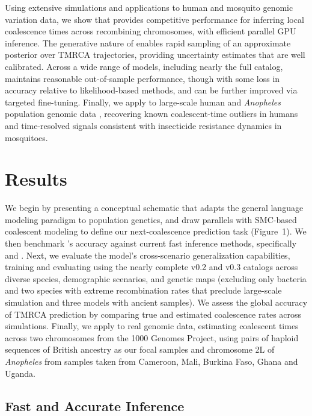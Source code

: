 \documentclass[9pt,twocolumn,twoside]{pnas-new}
\begin{document}
Using extensive simulations and applications to human and mosquito genomic variation data,
we show that \cxtkit provides competitive performance for
inferring local coalescence times across recombining chromosomes,
with efficient parallel GPU inference.
The generative nature of \cxtkit enables rapid sampling of an approximate posterior over TMRCA trajectories,
providing uncertainty estimates that are well calibrated.
Across a wide range of models, including nearly the full \stdpopsim catalog,
\cxtkit maintains reasonable out-of-sample performance, though with some loss in accuracy relative to likelihood-based methods, and can be further improved via targeted fine-tuning.
Finally, we apply \cxtkit to large-scale human and \textit{Anopheles} population genomic data
\cite{10002010map, auton20151000, anopheles2017genetic, clarkson2020genome},
recovering known coalescent-time outliers in humans and time-resolved signals consistent with insecticide resistance dynamics in mosquitoes.

\section*{Results}

We begin by presenting a conceptual schematic that adapts the general language modeling paradigm to population genetics, and draw parallels with SMC-based coalescent modeling to define our next-coalescence prediction task (Figure~1). We then benchmark \cxtkit's accuracy against current fast inference 
methods, specifically \singer and \smcpp \cite{deng_robust_2024, terhorst_robust_2017}. 
Next, we evaluate the model's cross-scenario generalization capabilities, 
training and evaluating using the nearly complete \stdpopsim v0.2 and v0.3 catalogs across diverse species, demographic scenarios, and genetic maps (excluding only bacteria and two species with extreme recombination rates that preclude large-scale simulation and three models with ancient samples). 
We assess the global accuracy of TMRCA prediction by comparing true and estimated coalescence rates across simulations. 
Finally, we apply \cxtkit to real genomic data, estimating coalescent times across two
chromosomes from the 1000 Genomes Project, using pairs of haploid sequences of British ancestry as our focal samples and chromosome 2L of \textit{Anopheles} from samples taken from Cameroon, Mali, Burkina Faso, Ghana and Uganda.




\subsection*{Fast and Accurate Inference}
\end{document}
